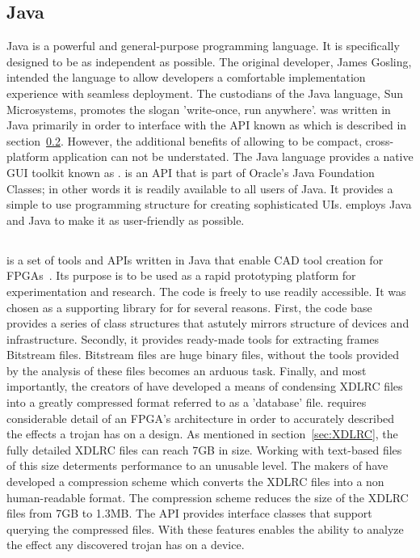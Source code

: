 \subsection{Java} \label{sec:java}
Java is a powerful and general-purpose programming language. 
It is specifically designed to be as independent as possible.
The original developer, James Gosling, intended the language to allow developers a comfortable implementation experience with seamless deployment. 
The custodians of the Java language, Sun Microsystems, promotes the slogan 'write-once, run anywhere'.  
\Name was written in Java primarily in order to interface with the \acrshort{API} known as \RapidSmith which is described in section~\ref{sec:rapidSmith}.
However, the additional benefits of allowing \Name to be compact, cross-platform application can not be understated.
The Java language provides a native \acrfull{GUI} toolkit known as \Swing.
\Swing is an \acrshort{API} that is part of Oracle's Java Foundation Classes; in other words it is readily available to all users of Java.
It provides a simple to use programming structure for creating sophisticated \acrshort{UIs}.
\Name employs Java and Java \Swing to make it as user-friendly as possible. 

\subsection{\RapidSmith} \label{sec:rapidSmith}
\RapidSmith is a set of tools and \acrfull{APIs} written in Java that enable \acrfull{CAD} tool creation for \Xilinx \acrshort{FPGA}s~\cite{rapidSmith}.
Its purpose is to be used as a rapid prototyping platform for experimentation and research.
The code is freely to use readily accessible.
It was chosen as a supporting library for \Name for several reasons.
First, the code base provides a series of class structures that astutely mirrors structure of \Xilinx devices and infrastructure.
Secondly, it provides ready-made tools for extracting frames \gls{Bitstream} files. 
\gls{Bitstream} files are huge binary files, without the tools provided by \RapidSmith the analysis of these files becomes an arduous task.
Finally, and most importantly, the creators of \RapidSmith have developed a means of condensing XDLRC files into a greatly compressed format referred to as a 'database' file.
\Name requires considerable detail of an \acrshort{FPGA}'s architecture in order to accurately described the effects a trojan has on a design.
As mentioned in section~\ref{sec:XDLRC}, the fully detailed XDLRC files can reach 7GB in size.
Working with text-based files of this size determents performance to an unusable level.
The makers of \RapidSmith have developed a compression scheme which converts the XDLRC files into a non human-readable format.
The compression scheme reduces the size of the XDLRC files from 7GB to 1.3MB. 
The \acrshort{API} provides interface classes that support querying the compressed files.
With these features \RapidSmith enables the ability to analyze the effect any discovered trojan has on a device.
